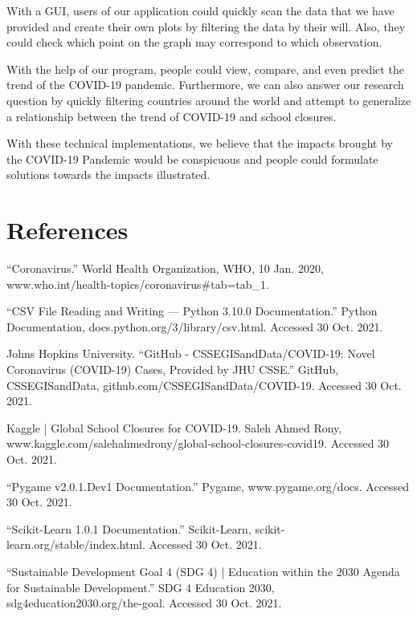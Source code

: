 \documentclass[fontsize=11pt]{article}
\begin{document}
With a GUI, users of our application could quickly scan the data that we have provided and create their own plots by filtering the data by their will. Also, they could check which point on the graph may correspond to which observation.

With the help of our program, people could view, compare, and even predict the trend of the COVID-19 pandemic. Furthermore, we can also answer our research question by quickly filtering countries around the world and attempt to generalize a relationship between the trend of COVID-19 and school closures.

With these technical implementations, we believe that the impacts brought by the COVID-19 Pandemic would be conspicuous and people could formulate solutions towards the impacts illustrated.

\newpage

\section*{References}

“Coronavirus.” World Health Organization, WHO, 10 Jan. 2020, www.who.int/health-topics/coronavirus\#tab=tab\_1.

“CSV File Reading and Writing — Python 3.10.0 Documentation.” Python Documentation, docs.python.org/3/library/csv.html. Accessed 30 Oct. 2021.

Johns Hopkins University. “GitHub - CSSEGISandData/COVID-19: Novel Coronavirus (COVID-19) Cases, Provided by JHU CSSE.” GitHub, CSSEGISandData, github.com/CSSEGISandData/COVID-19. Accessed 30 Oct. 2021.

Kaggle | Global School Closures for COVID-19. Saleh Ahmed Rony, www.kaggle.com/salehahmedrony/global-school-closures-covid19. Accessed 30 Oct. 2021.

“Pygame v2.0.1.Dev1 Documentation.” Pygame, www.pygame.org/docs. Accessed 30 Oct. 2021.

“Scikit-Learn 1.0.1 Documentation.” Scikit-Learn, scikit-learn.org/stable/index.html. Accessed 30 Oct. 2021.

“Sustainable Development Goal 4 (SDG 4) | Education within the 2030 Agenda for Sustainable Development.” SDG 4 Education 2030, sdg4education2030.org/the-goal. Accessed 30 Oct. 2021.
\end{document}
